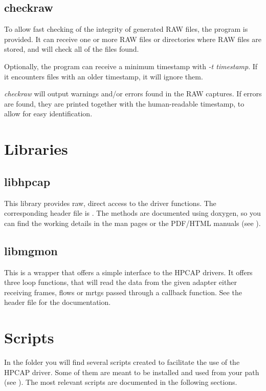 \documentclass[oneside]{hpman}
\begin{document}
\subsection{checkraw}

To allow fast checking of the integrity of generated RAW files, the  program is provided. It can receive one or more RAW files or directories where RAW files are stored, and will check all of the files found.

Optionally, the program can receive a minimum timestamp with \textit{-t timestamp}. If it encounters files with an older timestamp, it will ignore them.

\textit{checkraw} will output warnings and/or errors found in the RAW captures. If errors are found, they are printed together with the human-readable timestamp, to allow for easy identification.

\section{Libraries}
\label{sec:libs}

\subsection{libhpcap}
\label{sec:libs:libhpcap}

This library provides raw, direct access to the driver functions. The corresponding header file is . The methods are documented using doxygen, so you can find the working details in the man pages or the PDF/HTML manuals (see ).

\subsection{libmgmon}
\label{sec:libs:libmgmon}

This is a wrapper that offers a simple interface to the HPCAP drivers. It offers three loop functions, that will read the data from the given adapter either receiving frames, flows or mrtgs passed through a callback function. See the  header file for the documentation.

\section{Scripts}
\label{sec:scripts}

In the  folder you will find several scripts created to facilitate the use of the HPCAP driver. Some of them are meant to be installed and used from your path (see ). The most relevant scripts are documented in the following sections.
\end{document}
